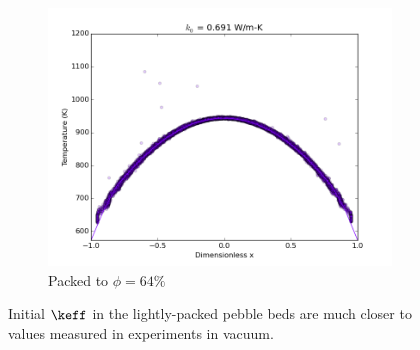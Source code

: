 \begin{figure}[!ht]
	\begin{subfigure}[b]{0.4\textwidth}
		\centering
		\includegraphics[width=\textwidth]{chapters/figures/initial_packing_study/64percent-deform-packing.png}
		\caption{Packed to $\phi = 64\%$}
	\end{subfigure}
	\caption{Initial $\keff$ in the lightly-packed pebble beds are much closer to values measured in experiments in vacuum.}
\label{fig:keff-initial}
\end{figure}





\FloatBarrier